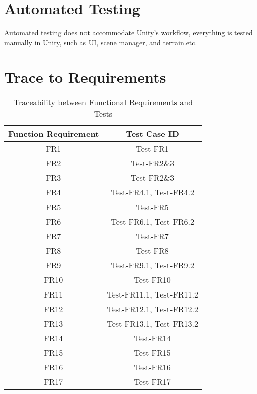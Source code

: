 \documentclass[12pt, titlepage]{article}
\begin{document}
\section{Automated Testing}
Automated testing does not accommodate Unity's workflow, everything is tested manually in Unity, such as UI, scene manager, and terrain.etc.

\newpage

\section{Trace to Requirements}
\begin{table}[H]
    \centering
    \begin{tabular}{|c|c|}
    \hline
    Function Requirement     &  Test Case ID\\
    \hline
    FR1     & Test-FR1\\
    \hline
    FR2 & Test-FR2\&3\\
    \hline
    FR3 & Test-FR2\&3\\
    \hline
     FR4 & Test-FR4.1, Test-FR4.2\\
    \hline
     FR5 & Test-FR5\\
    \hline
     FR6 & Test-FR6.1, Test-FR6.2\\
    \hline
     FR7 & Test-FR7\\
    \hline
     FR8 & Test-FR8\\
    \hline
     FR9 & Test-FR9.1, Test-FR9.2\\
    \hline
     FR10 & Test-FR10\\
    \hline
     FR11 & Test-FR11.1, Test-FR11.2\\
    \hline 
     FR12 & Test-FR12.1, Test-FR12.2\\
    \hline
    FR13 & Test-FR13.1, Test-FR13.2\\
    \hline
    FR14 & Test-FR14\\
    \hline
    FR15 & Test-FR15\\
    \hline
    FR16 & Test-FR16\\
    \hline
    FR17 & Test-FR17\\
    \hline
    \end{tabular}
    \caption{Traceability between Functional Requirements and Tests}
\end{table}

\newpage
\end{document}
